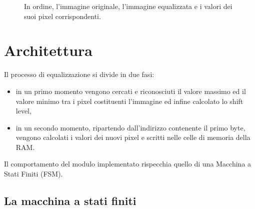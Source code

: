 \documentclass[11pt]{article}
\begin{document}
\begin{figure}[ht]
        \caption{In ordine, l'immagine originale, l'immagine equalizzata e i valori dei suoi pixel corrispondenti.}
    
    \end{figure}
\newpage
\section{Architettura}
    Il processo di equalizzazione si divide in due fasi: 
    \begin{itemize}
        \item in un primo momento vengono cercati e riconosciuti il valore massimo ed il valore minimo tra i pixel costituenti l'immagine ed infine calcolato lo shift level, 
        \item in un secondo momento, ripartendo dall'indirizzo contenente il primo byte, vengono calcolati i valori dei nuovi pixel e scritti nelle celle di memoria della RAM.
    \end{itemize}
    
    Il comportamento del modulo implementato rispecchia quello di una Macchina a Stati Finiti (FSM).

    \subsection{La macchina a stati finiti}
    
\end{document}
